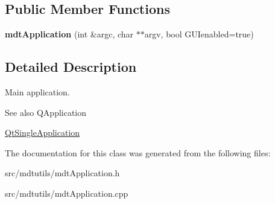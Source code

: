 \subsection*{Public Member Functions}
\begin{DoxyCompactItemize}
\item 
\hypertarget{classmdt_application_ab6268414770ee9239c83677c15a67f75}{
{\bfseries mdtApplication} (int \&argc, char $\ast$$\ast$argv, bool GUIenabled=true)}
\label{classmdt_application_ab6268414770ee9239c83677c15a67f75}

\end{DoxyCompactItemize}


\subsection{Detailed Description}
Main application. 

\begin{DoxySeeAlso}{See also}
QApplication 

\hyperlink{class_qt_single_application}{QtSingleApplication} 
\end{DoxySeeAlso}


The documentation for this class was generated from the following files:\begin{DoxyCompactItemize}
\item 
src/mdtutils/mdtApplication.h\item 
src/mdtutils/mdtApplication.cpp\end{DoxyCompactItemize}
